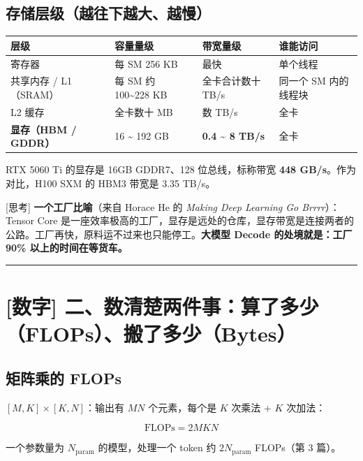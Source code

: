 \subsection{存储层级（越往下越大、越慢）}

\begin{center}
\small
\begin{tabularx}{\textwidth}{p{2.5cm} p{3.5cm} X X}
\toprule
\textbf{层级} & \textbf{容量量级} & \textbf{带宽量级} & \textbf{谁能访问} \\
\midrule
寄存器 & 每 SM 256 KB & 最快 & 单个线程 \\
共享内存 / L1（SRAM） & 每 SM 约 100\textasciitilde{}228 KB & 全卡合计数十 TB/s & 同一个 SM 内的线程块 \\
L2 缓存 & 全卡数十 MB & 数 TB/s & 全卡 \\
\textbf{显存（HBM / GDDR）} & 16 \textasciitilde{} 192 GB & \textbf{0.4 \textasciitilde{} 8 TB/s} & 全卡 \\
\bottomrule
\end{tabularx}
\end{center}

RTX 5060 Ti 的显存是 16GB GDDR7、128 位总线，标称带宽 \textbf{448 GB/s}。作为对比，H100 SXM 的 HBM3 带宽是 3.35 TB/s。

\begin{tipBox}[核心直觉与思考]
{}[思考] \textbf{一个工厂比喻}（来自 Horace He 的 \textit{Making Deep Learning Go Brrrr}）：Tensor Core 是一座效率极高的工厂，显存是远处的仓库，显存带宽是连接两者的公路。工厂再快，原料运不过来也只能停工。\textbf{大模型 Decode 的处境就是：工厂 90\% 以上的时间在等货车。}
\end{tipBox}

\vspace{0.8em}\hrule\vspace{0.8em}

\section{[数字] 二、数清楚两件事：算了多少（FLOPs）、搬了多少（Bytes）}

\subsection{矩阵乘的 FLOPs}

$[M, K] \times [K, N]$：输出有 $MN$ 个元素，每个是 $K$ 次乘法 + $K$ 次加法：

\[
\text{FLOPs} = 2MKN
\]

一个参数量为 $N_{\text{param}}$ 的模型，处理一个 token 约 $2N_{\text{param}}$ FLOPs（第 3 篇）。

